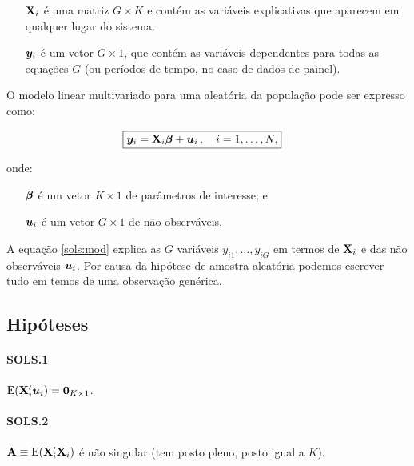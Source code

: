 \documentclass[11pt, oneside, a4paper, article]{article}
\numberwithin{equation}{section}
\begin{document}
\vspace{-1 em}
\begin{itemize}[itemsep = -1ex]
	\item [$\mathbf{X}_{i}$]  é uma matriz $G \times K$ e contém as variáveis explicativas que aparecem em qualquer lugar do sistema.
	\item [$\boldsymbol{y}_{i}$]  é um vetor $G \times 1$, que contém as variáveis dependentes para todas as equações $G$ (ou períodos de tempo, no caso de dados de painel).
\end{itemize}

O modelo linear multivariado para uma  aleatória da população pode ser expresso como:

\vspace{-1 em}
\begin{align}\label{sols:mod}
	\Aboxed{
		\yvec_{i} = \Xmat_{i} \betavec + \uvec_{i} \, , \quad i=1, \dots, N,
	}
\end{align}

\noindent
onde:

\vspace{-1 em}
\begin{itemize}[itemsep = -1ex]
	\item [$\boldsymbol{\beta}$] é um vetor $K \times 1$ de parâmetros de interesse; e
	\item [$\boldsymbol{u}_{i}$] é um vetor $G \times 1$ de não observáveis.
\end{itemize}

A equação \eqref{sols:mod} explica as $G$ variáveis $y_{i1}, \dots, y_{iG}$ em termos de $\mathbf{X}_{i}$ e das não observáveis $\boldsymbol{u}_{i}$.
Por causa da hipótese de amostra aleatória podemos escrever tudo em temos de uma observação genérica.

\subsection{Hipóteses}
\noindent
\citet[Sec.7.3.1]{wool-2010}

\paragraph{SOLS.1} $\text{E}(\mathbf{X}_{i}' \boldsymbol{u}_{i}) = \boldsymbol{0}_{K \times 1}$.

\paragraph{SOLS.2} $\mathbf{A} \equiv \text{E}( \mathbf{X}_{i}' \mathbf{X}_{i} )$ é não singular (tem posto pleno, posto igual a $K$). 
\end{document}
